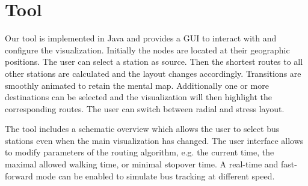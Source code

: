 \documentclass[a4paper, twocolumn,
final
]{article}
\begin{document}
\section*{Tool}
Our tool is implemented in Java and provides a GUI to interact with and configure the visualization.
Initially the nodes are located at their geographic positions. The user can select a station as source.
Then the shortest routes to all other stations are calculated and the layout changes accordingly.
Transitions are smoothly animated to retain the mental map.
Additionally one or more destinations can be selected and the visualization will then highlight the corresponding routes. The user can switch between radial and stress layout.

The tool includes a schematic overview
which allows the user to select bus stations even when the main visualization has changed.
The user interface allows to modify parameters of the routing algorithm, e.g. the 
current time, the maximal allowed walking time, or minimal stopover time.
A real-time and fast-forward mode can be enabled to simulate bus tracking at different speed.
\end{document}
